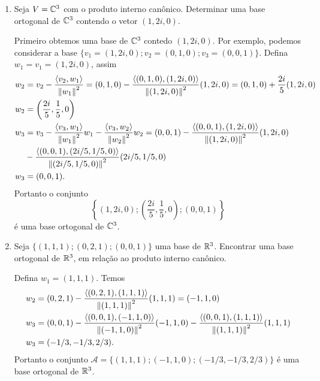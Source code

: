\begin{exemplo}
	\begin{enumerate}
		\item Seja $V = \mathbb{C}^3$ com o produto interno can\^onico. Determinar uma base ortogonal de $\mathbb{C}^3$ contendo o vetor $(1, 2i, 0)$.
		\begin{solucao}
			Primeiro obtemos uma base de $\mathbb{C}^3$ contedo $(1, 2i, 0)$. Por exemplo, podemos considerar a base $\{v_1 = (1, 2i, 0); v_2 = (0, 1, 0); v_3 = (0, 0, 1)\}$. Defina $w_1 = v_1 = (1, 2i, 0)$, assim
			\begin{align*}
				w_2 &= v_2 - \dfrac{\langle v_2, w_1\rangle}{\left\lVert w_1\right\rVert^2} = (0, 1, 0) - \dfrac{\langle (0, 1, 0), (1, 2i, 0)\rangle}{\left\lVert(1, 2i, 0)\right\rVert^2}(1, 2i, 0) = (0, 1, 0) + \dfrac{2i}{5}(1, 2i, 0)\\ w_2 &= \left(\dfrac{2i}{5}, \dfrac{1}{5}, 0\right)\\
				w_3 &= v_3 - \dfrac{\langle v_3, w_1\rangle}{\left\lVert w_1\right\rVert^2}w_1 - \dfrac{\langle v_3, w_2\rangle}{\left\lVert w_2\right\rVert^2}w_2 = (0, 0, 1) - \dfrac{\langle (0, 0, 1), (1, 2i, 0)\rangle}{\left\lVert(1, 2i, 0)\right\rVert^2}(1, 2i, 0) \\ &- \dfrac{\langle (0, 0, 1), (2i/5, 1/5, 0)\rangle}{\left\lVert(2i/5, 1/5, 0)\right\rVert^2}(2i/5, 1/5, 0) \\ w_3 &= (0, 0, 1).
			\end{align*}
			Portanto o conjunto
			\[
				\left\{(1, 2i, 0); \left(\dfrac{2i}{5}, \dfrac{1}{5},0\right); (0, 0, 1)\right\}
			\]
			\'e uma base ortogonal de $\mathbb{C}^3$.
		\end{solucao}
		\item Seja $\{(1, 1, 1); (0, 2, 1); (0, 0, 1)\}$ uma base de $\mathbb{R}^3$. Encontrar uma base ortogonal de $\mathbb{R}^3$, em rela\c{c}\~ao ao produto interno can\^onico.
		\begin{solucao}
			Defina $w_1 = (1, 1, 1)$. Temos
			\begin{align*}
				w_2 &= (0, 2, 1) - \dfrac{\langle (0, 2, 1) , (1, 1, 1)\rangle}{\left\lVert(1, 1, 1)\right\rVert^2}(1, 1, 1) = (-1, 1, 0)\\
				w_3 &= (0, 0 ,1) - \dfrac{\langle (0, 0, 1), (-1, 1, 0)\rangle}{\left\lVert(-1, 1, 0)\right\rVert^2}(-1, 1, 0) - \dfrac{\langle (0, 0, 1), (1, 1, 1)\rangle}{\left\lVert(1, 1, 1)\right\rVert^2}(1, 1, 1)\\ w_3 &= (-1/3, -1/3, 2/3).
			\end{align*}
			Portanto o conjunto $\mathcal{A} = \{(1, 1, 1); (-1, 1, 0); (-1/3, -1/3, 2/3)\}$ \'e uma base ortogonal de $\mathbb{R}^3$.
		\end{solucao}
	\end{enumerate}
\end{exemplo}

